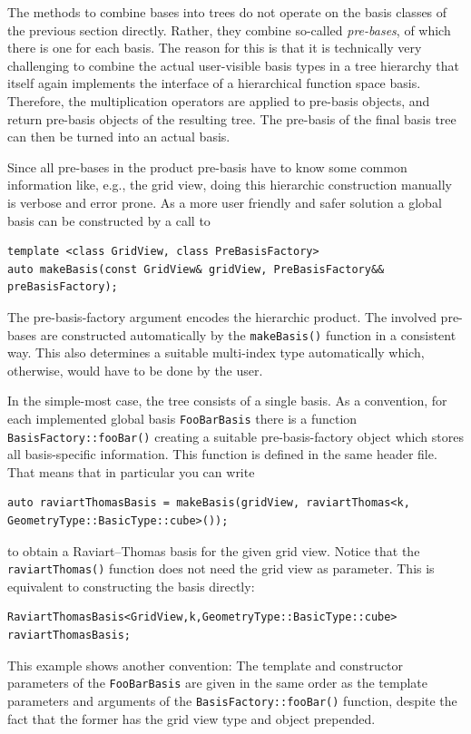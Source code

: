 \documentclass[a4paper,10pt,headings=normal,bibliography=totoc]{scrartcl}
\newcommand{\cpp}[1]{\lstinline[basicstyle=\ttfamily]!#1!}
\newcommand{\todosander}[1]{\todo[inline,color=orange,author=OS]{#1}}
\begin{document}
The methods to combine bases into trees do not operate on the basis classes of the previous section
directly.  Rather, they combine so-called \emph{pre-bases}, of which there is one for each basis.
The reason for this is
that it is technically very challenging to combine the actual user-visible basis types in a
tree hierarchy that itself again implements the interface of a hierarchical function space basis.
Therefore, the multiplication operators are applied to pre-basis objects, and return pre-basis
objects of the resulting tree.
The pre-basis of the final basis tree can then be turned into an actual basis.

Since all pre-bases in the product pre-basis have to know some common information
like, e.g., the grid view, doing this hierarchic construction
manually is verbose and error prone. As a more user friendly and safer solution
a global basis can be constructed by a call to
\begin{lstlisting}[style=Interface]
template <class GridView, class PreBasisFactory>
auto makeBasis(const GridView& gridView, PreBasisFactory&& preBasisFactory);
\end{lstlisting}
The pre-basis-factory argument encodes the hierarchic product.
The involved pre-bases are constructed automatically by the
\cpp{makeBasis()} function in a consistent way.
This also determines a suitable multi-index type automatically
which, otherwise, would have to be done by the user.

In the simple-most case, the tree consists of a single basis.
As a convention, for each implemented global basis
\cpp{FooBarBasis} there is a function \cpp{BasisFactory::fooBar()}
creating a suitable pre-basis-factory object which
stores all basis-specific information.
This function is defined in the same header file.
That means that in particular you can write
\todosander{Darf nicht mehr \cpp{BasisType} benutzen!}
\begin{lstlisting}[style=Example]
auto raviartThomasBasis = makeBasis(gridView, raviartThomas<k, GeometryType::BasicType::cube>());
\end{lstlisting}
to obtain a Raviart--Thomas basis for the given grid view.
Notice that the \cpp{raviartThomas()} function does not need
the grid view as parameter.
This is equivalent to constructing
the basis directly:
\begin{lstlisting}[style=Example]
RaviartThomasBasis<GridView,k,GeometryType::BasicType::cube> raviartThomasBasis;
\end{lstlisting}
This example shows another convention: The template and constructor parameters
of the \cpp{FooBarBasis} are given in the same order as the template
parameters and arguments of the \cpp{BasisFactory::fooBar()} function,
despite the fact that the former has the grid view type and object prepended.
\end{document}
